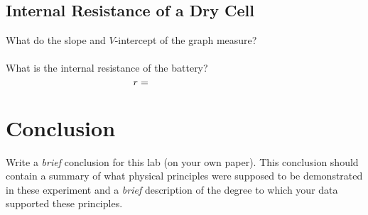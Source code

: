 \subsection{Internal Resistance of a Dry Cell}

What do the slope and $V$-intercept of the graph measure? \\
\vspace*{1cm}\\
What is the internal resistance of the battery? \\
\vspace*{2mm}
$$r=\mbox{\hspace*{3cm}}$$


\section{Conclusion}
Write a {\it brief} conclusion for this lab (on your own paper). This conclusion should
contain a summary of what physical principles were supposed to be demonstrated in
these experiment and a {\it brief} description of the degree to which your data 
supported these principles.







